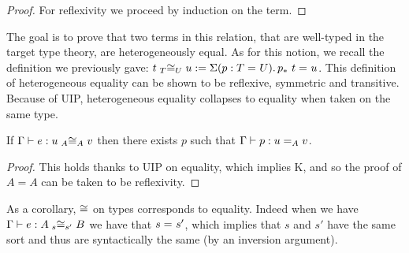 \begin{proof}
  For reflexivity we proceed by induction on the term.
\end{proof}


%

The goal is to prove that two terms in this relation, that are well-typed in the
target type theory, are heterogeneously equal. As for this notion, we recall
the definition we previously gave:
$\Heq{T}{t}{U}{u} := \Sum{p:\Eq{}{T}{U}} \Eq{}{\translpo{p}\ t}{u}$.
%
This definition of heterogeneous equality can be shown to be
reflexive, symmetric and transitive. Because of UIP, heterogeneous
equality collapses to equality when taken on the same type.

\begin{lemma}
  \label{lem:uip-cong}
  If $\isterm{\Ga}{e}{\Heq{A}{u}{A}{v}}$
  then there exists $p$ such that $\isterm{\Ga}{p}{\Eq{A}{u}{v}}$.
\end{lemma}

\begin{proof}
  This holds thanks to UIP on equality, which implies K, and so the
  proof of $A = A$ can be taken to be reflexivity.
\end{proof}

\begin{remark}
  As a corollary, $\Heqs$ on types corresponds to equality.
  Indeed when we have $\isterm{\Ga}{e}{\Heq{s}{A}{s'}{B}}$ we have
  that $\Eq{}{s}{s'}$, which implies that $s$ and $s'$ have the same sort
  and thus are syntactically the same (by an inversion argument).
\end{remark}


